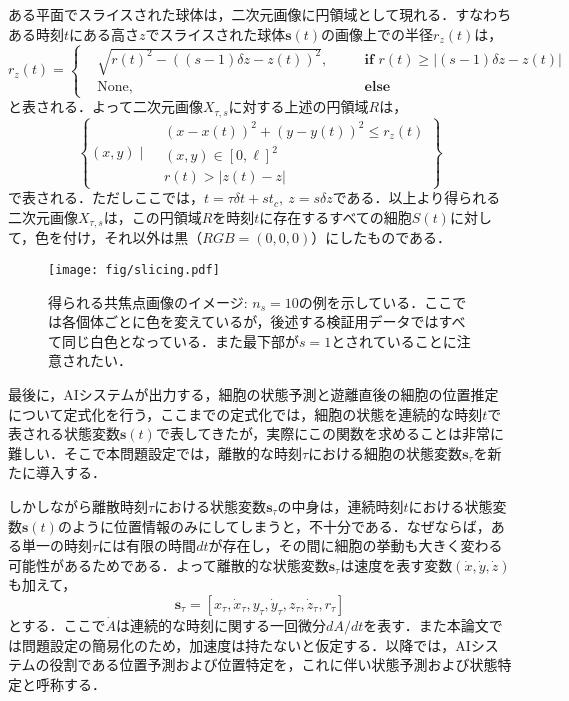 ある平面でスライスされた球体は，二次元画像に円領域として現れる．すなわちある時刻$t$にある高さ$z$でスライスされた球体$\bm{s}(t)$の画像上での半径$r_{z}(t)$は，
\begin{equation}
    \label{eq:appearant_radius}
    r_{z}(t) = \left\{
        \begin{aligned}
            &\sqrt{r(t)^2 - \left((s - 1)\delta z - z(t)\right)^2},\quad &&\textbf{if } r(t) \geq \left|(s - 1)\delta z - z(t)\right|
            \\ &\text{None},&& \textbf{else}
        \end{aligned}
    \right.
\end{equation}
と表される．よって二次元画像$X_{\tau, s}$に対する上述の円領域$R$は，
\begin{equation}
    \label{eq:circle_region}
    \left\{ (x, y) \mid 
        \begin{aligned}
            &(x - x(t))^2 + (y - y(t))^2 \leq r_z(t)
            \\ & (x, y) \in [0, \ell]^2
            \\ & r(t) > \left|z(t) - z\right|
        \end{aligned}
    \right\}
\end{equation}
で表される．ただしここでは，$t = \tau \delta t + s t_c, ~ z = s \delta z$である．以上より得られる二次元画像$X_{\tau, s}$は，この円領域$R$を時刻$t$に存在するすべての細胞$S(t)$に対して，色を付け，それ以外は黒（$RGB=(0,0,0)$）にしたものである．

\begin{figure}[t]
    \centering
    \texttt{[image: fig/slicing.pdf]}
    \caption[得られる共焦点画像のイメージ]{得られる共焦点画像のイメージ: $n_s=10$の例を示している．ここでは各個体ごとに色を変えているが，後述する検証用データではすべて同じ白色となっている．また最下部が$s=1$とされていることに注意されたい．}
    \label{fig:sliced_image}
\end{figure}

最後に，AIシステムが出力する，細胞の状態予測と遊離直後の細胞の位置推定について定式化を行う，ここまでの定式化では，細胞の状態を連続的な時刻$t$で表される状態変数$\bm{s}(t)$で表してきたが，実際にこの関数を求めることは非常に難しい．そこで本問題設定では，離散的な時刻$\tau$における細胞の状態変数$\bm{s}_{\tau}$を新たに導入する．

しかしながら離散時刻$\tau$における状態変数$\bm{s}_{\tau}$の中身は，連続時刻$t$における状態変数$\bm{s}(t)$のように位置情報のみにしてしまうと，不十分である．なぜならば，ある単一の時刻$\tau$には有限の時間$dt$が存在し，その間に細胞の挙動も大きく変わる可能性があるためである．よって離散的な状態変数$\bm{s}_{\tau}$は速度を表す変数$(\dot{x}, \dot{y}, \dot{z})$も加えて，
\begin{equation}
    \label{eq:discreted_state_vector}
    \bm{s}_{\tau} = \left[x_{\tau}, \dot{x}_{\tau}, y_{\tau}, \dot{y}_{\tau}, z_{\tau}, \dot{z}_{\tau}, r_{\tau}\right]
\end{equation}
とする．ここで$\dot{A}$は連続的な時刻に関する一回微分$dA/dt$を表す．また本論文では問題設定の簡易化のため，加速度は持たないと仮定する．以降では，AIシステムの役割である位置予測および位置特定を，これに伴い状態予測および状態特定と呼称する．

